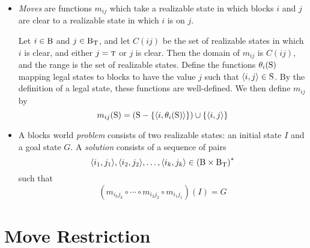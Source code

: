 \documentclass{article}
\newcommand{\bstate}{{\mbox{\cal S}}}
\newcommand{\blocks}{{\mbox{\cal B}}}
\newcommand{\tabtop}{{\mbox{\sc t}}}
\newcommand{\tblocks}{{\blocks_\tabtop}}
\begin{document}
\begin{itemize}
\item {\em Moves} are functions $m_{ij}$ which take a realizable state in
which blocks $i$ and $j$ are clear to a
realizable state in which $i$ is on $j$.

Let $i \in \blocks$ and $j \in \tblocks$, and let $C(ij)$ be the set
of realizable states
in which $i$ is clear, and either $j = \tabtop$ or $j$ is clear.
Then the domain of $m_{ij}$ is
$C(ij)$, and the range is the set of realizable states.
Define the functions $\theta_i(\bstate)$ mapping legal states to
blocks to have the value $j$
such that $\langle i, j \rangle \in \bstate$.
By the definition of a legal state, these functions are well-defined.
We then define
$m_{ij}$ by $$
  m_{ij}(\bstate) =
    \left ( \bstate - \{ \langle i, \theta_i(\bstate) \rangle \} \right )
    \cup \{ \langle i, j \rangle \}
$$

\item A blocks world {\em problem} consists of two realizable states: an
initial state $I$ and a goal state $G$.  A {\em solution} consists of
a sequence of pairs $$
  \langle i_1, j_1 \rangle , \langle i_2 , j_2 \rangle , \ldots ,
  \langle i_k , j_k \rangle \in \left ( \blocks \times \tblocks \right ) ^ \ast
$$
such that $$
  \left ( m_{i_k j_k} \circ \cdots \circ m_{i_2 j_2} \circ
  m_{i_1 j_1} \right ) (I) = G
$$
\end{itemize}

\section{Move Restriction}
\end{document}
